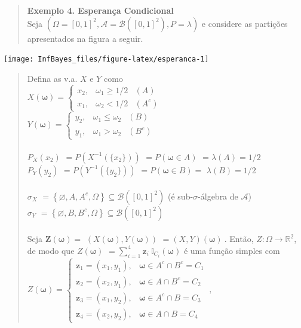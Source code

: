 \documentclass[
]{book}
\begin{document}
\(~\)

\(~\)

\begin{quote}
\textbf{Exemplo 4. Esperança Condicional}\\
Seja \((\Omega=[0,1]^2, \mathcal{A}=\mathcal{B}([0,1]^2),P=\lambda)\) e considere as partições apresentados na figura a seguir.
\end{quote}

\begin{center}\texttt{[image: InfBayes\_files/figure-latex/esperanca-1]} \end{center}

\begin{quote}
Defina as v.a. \(X\) e \(Y\) como\\
\(X(\boldsymbol \omega)=\left\{\begin{array}{lll} x_2, & \omega_1 \geq 1/2 & (A)\\ x_1, & \omega_2 < 1/2 & (A^c)\end{array}\right.\)\\
\(Y(\boldsymbol \omega)=\left\{\begin{array}{lll} y_2, & \omega_1 \leq \omega_2 & (B)\\ y_1, & \omega_1 > \omega_2& (B^c)\end{array}\right.\)\\
\(~\)\\
\(P_X(x_2)\) \(=P\left(X^{-1}\left(\{x_2\}\right)\right)\) \(=P(\boldsymbol\omega \in A)\) \(=\lambda(A)=1/2\)\\
\(P_Y(y_2)\) \(=P\left(Y^{-1}\left(\{y_2\}\right)\right)\) \(=P(\boldsymbol\omega \in B)=\) \(\lambda(B)=1/2\)\\
\(~\)\\
\(\sigma_X\) \(=\left\{\varnothing,A,A^c,\Omega\right\} \subseteq \mathcal{B}\left([0,1]^2\right)\) (é sub-\(\sigma\)-álgebra de \(\mathcal{A}\))\\
\(\sigma_Y\) \(=\left\{\varnothing,B,B^c,\Omega\right\} \subseteq \mathcal{B}\left([0,1]^2\right)\)\\
\(~\)\\
Seja \(\boldsymbol Z(\boldsymbol \omega)=\) \(\left(X(\boldsymbol \omega), Y(\boldsymbol \omega)\right)\) \(=(X,Y)(\boldsymbol \omega)~.\) Então, \(Z: \Omega\longrightarrow \mathbb{R}^2\), de modo que \(Z(\boldsymbol \omega)\) \(=\displaystyle\sum_{i=1}^4 \boldsymbol z_i ~\mathbb{I}_{C_i}(\boldsymbol \omega)\) é uma função simples com\\
\(Z(\boldsymbol \omega)=\left\{\begin{array}{ll} \boldsymbol z_1=(x_1,y_1), & \boldsymbol \omega \in A^c \cap B^c=C_1\\ \boldsymbol z_2=(x_2,y_1), & \boldsymbol \omega \in A \cap B^c=C_2\\ \boldsymbol z_3=(x_1,y_2), & \boldsymbol \omega \in A^c \cap B=C_3\\ \boldsymbol z_4=(x_2,y_2), & \boldsymbol \omega \in A \cap B=C_4 \end{array}\right.~,\)\\

\end{quote}
\end{document}
